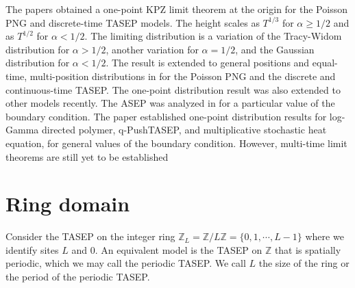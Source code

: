 \documentclass[10pt]{article}
\theoremstyle{plain}
\theoremstyle{definition}
\newcommand{\Z}{\mathbb{Z}}
\numberwithin{equation}{section}
\begin{document}
The papers \cite{Baik-Rains01a, Baik-Rains01} obtained a one-point KPZ limit theorem at the origin for the Poisson PNG and discrete-time TASEP models. 
The height scales as $T^{1/3}$ for $\alpha\ge 1/2$ and as $T^{1/2}$ for $\alpha<1/2$. 
The limiting distribution is  a variation of the Tracy-Widom distribution for $\alpha>1/2$, another variation for $\alpha=1/2$, and the Gaussian distribution for $\alpha<1/2$. 
The result is extended to general positions and equal-time, multi-position distributions in \cite{Sasamoto-Imamura04, Baik-Barraquand-Corwin-Suidan18} for the Poisson PNG and the discrete and continuous-time TASEP. 
The one-point distribution result was also extended to other models recently. The ASEP was analyzed in \cite{Barraquand-Borodin-Corwin-Wheeler18} for a particular value of the boundary condition.
The paper \cite{Imamura-Mucciconi-Sasamoto22} established one-point distribution results for log-Gamma directed polymer, q-PushTASEP, and multiplicative stochastic heat equation,
 for general values of the boundary condition.  However, multi-time limit theorems are still yet to be established

\section{Ring domain} \label{sec:ring}

Consider the TASEP on the integer ring $\Z_L=\Z/L\Z=\{0, 1, \cdots, L-1\}$ where we identify sites $L$ and $0$. 
An equivalent model is the TASEP on $\Z$ that is spatially periodic, which we may call the periodic TASEP. 
We call $L$ the size of the ring or the period of the periodic TASEP.  
\end{document}
